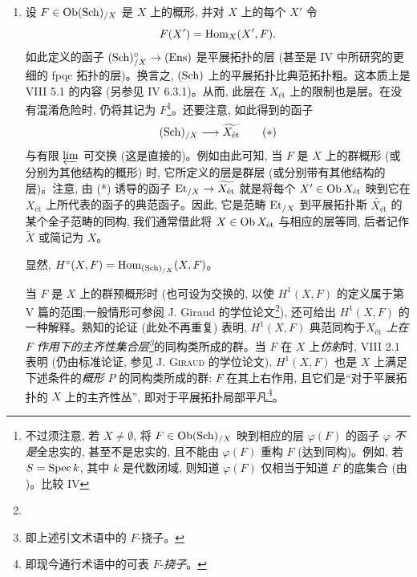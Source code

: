 \begin{enumerate}
\renewcommand{\theenumi}{\alph{enumi}}
\renewcommand{\labelenumi}{\theenumi)}
\item 设 $F\in\operatorname{Ob}(\operatorname{Sch})_{/X}$ 是 $X$ 上的概形, 并对 $X$ 上的每个 $X'$ 令
$$
F(X') = \operatorname{Hom}_X (X', F){}.
$$
如此定义的函子 $(\Sch)^{\circ}_{/X}\to(\Ens)$ 是平展拓扑的层 (甚至是  IV 中所研究的更细的 fpqc 拓扑的层)。换言之, $(\operatorname{Sch})$ 上的平展拓扑比典范拓扑粗。这本质上是  VIII 5.1 的内容 (另参见  IV 6.3.1)。从而, 此层在 $X_{\text{ét}}$ 上的限制也是层。在没有混淆危险时, 仍将其记为 $F$\footnote{不过须注意, 若 $X\neq∅$, 将 $F\in\operatorname{Ob}(\operatorname{Sch})_{/X}$ 映到相应的层 $\varphi(F)$ 的函子 $\varphi$ \emph{不是}全忠实的, 甚至不是忠实的, 且不能由 $\varphi(F)$ 重构 $F$ (达到同构)。例如, 若 $S=\operatorname{Spec} k$, 其中 $k$ 是代数闭域, 则知道 $\varphi(F)$ 仅相当于知道 $F$ 的底集合 (由 )。比较 IV}。还要注意, 如此得到的函子
\begin{equation*}
(\Sch)_{/X} \to \widetilde{X_{\text{ét}}}\tag{$\ast$}
\end{equation*}
与有限 $\varprojlim$ 可交换 (这是直接的)。例如由此可知, 当 $F$ 是 $X$ 上的群概形 (或分别为其他结构的概形) 时, 它所定义的层是群层 (或分别带有其他结构的层)。注意, 由 (*) 诱导的函子 $\Et_{/X}\to\widetilde{X_{\text{ét}}}$ 就是将每个 $X'\in\operatorname{Ob} X_{\text{ét}}$ 映到它在 $X_{\text{ét}}$ 上所代表的函子的典范函子。因此, 它是范畴 $\operatorname{Et}_{/X}$ 到平展拓扑斯 $\widetilde{X_{\text{ét}}}$ 的某个全子范畴的同构, 我们通常借此将 $X\in\operatorname{Ob} X_{\text{ét}}$ 与相应的层等同, 后者记作 $\widetilde{X}$ 或简记为 $X$。

显然, $H^{\circ}(X,F)=\operatorname{Hom}_{(\operatorname{Sch})_{/X}}(X,F)$。

当 $F$ 是 $X$ 上的群预概形时 (也可设为交换的, 以使 $H^1(X,F)$ 的定义属于第 V 篇的范围;\pageoriginale 一般情形可参阅 J. Giraud 的学位论文\footnote{}), 还可给出 $H^1(X,F)$ 的一种解释。熟知的论证 (此处不再重复) 表明, $H^1(X,F)$ 典范同构于\emph{$X_{\text{ét}}$ 上在 $F$ 作用下的主齐性集合层\footnote{即上述引文术语中的 $F$-挠子。}}的同构类所成的群。当 $F$ 在 $X$ 上\emph{仿射}时,  VIII 2.1 表明 (仍由标准论证, 参见 J. \textsc{Giraud} 的学位论文), $H^1(X,F)$ 也是 $X$ 上满足下述条件的\emph{概形} $P$ 的同构类所成的群: $F$ 在其上右作用, 且它们是“对于平展拓扑的 $X$ 上的主齐性丛”, 即对于平展拓扑局部平凡\footnote{即现今通行术语中的可表 $F$-\emph{挠子}。}。
\end{enumerate}

